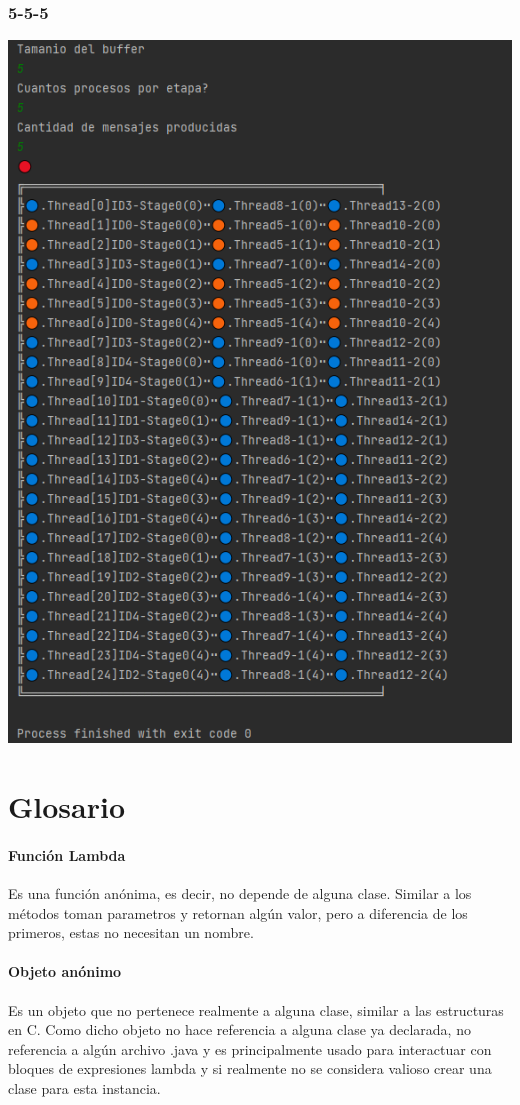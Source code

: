 \documentclass[a4paper]{article}
\begin{document}
    \subsubsection{5-5-5}
    \includegraphics{5-5-5.PNG}


    \section{Glosario}

    \paragraph{Funci\'on Lambda}
    Es una funci\'on an\'onima, es decir, no depende de alguna clase.
    Similar a los m\'etodos toman parametros y retornan alg\'un valor, pero a diferencia de los primeros, estas no necesitan un nombre.
    \paragraph{Objeto an\'onimo}
    Es un objeto que no pertenece realmente a alguna clase, similar a las estructuras en C.
    Como dicho objeto no hace referencia a alguna clase ya declarada, no referencia a alg\'un archivo .java y es principalmente usado para interactuar con bloques de expresiones lambda y si realmente no se considera valioso crear una clase para esta instancia.

\end{document}
